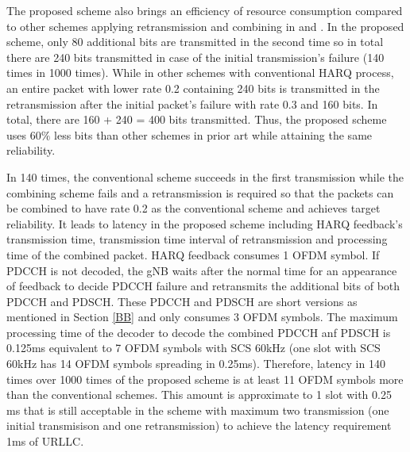 \documentclass[conference,10pt]{IEEEtran}
\begin{document}
The proposed scheme also brings an efficiency of resource consumption compared to other schemes applying retransmission and combining in \cite{b3} and \cite{b4}. In the proposed scheme, only 80 additional bits are transmitted in the second time so in total there are 240 bits transmitted in case of the initial transmission's failure (140 times in 1000 times). While in other schemes with conventional HARQ process, an entire packet with lower rate 0.2 containing 240 bits is transmitted in the retransmission after the initial packet's failure with rate 0.3 and 160 bits. In total, there are 160 + 240 = 400 bits transmitted. Thus, the proposed scheme uses 60$\%$ less bits than other schemes in prior art while attaining the same reliability.

In 140 times, the conventional scheme succeeds in the first transmission while the combining scheme fails and a retransmission is required so that the packets can be combined to have rate 0.2 as the conventional scheme and achieves target reliability. It leads to latency in the proposed scheme including HARQ feedback's transmission time, transmission time interval of retransmission and processing time of the combined packet. HARQ feedback consumes 1 OFDM symbol. If PDCCH is not decoded, the gNB waits after the normal time for an appearance of feedback to decide PDCCH failure and retransmits the additional bits of both PDCCH and PDSCH. These PDCCH and PDSCH are short versions as mentioned in Section \ref{BB} and only consumes 3 OFDM symbols. The maximum processing time of the decoder to decode the combined PDCCH anf PDSCH is 0.125ms equivalent to 7 OFDM symbols with SCS 60kHz (one slot with SCS 60kHz has 14 OFDM symbols spreading in 0.25ms). Therefore, latency in 140 times over 1000 times of the proposed scheme is at least 11 OFDM symbols more than the conventional schemes. This amount is approximate to 1 slot with 0.25 ms that is still acceptable in the scheme with maximum two transmission (one initial transmisison and one retransmission) to achieve the latency requirement 1ms of URLLC.
\end{document}

